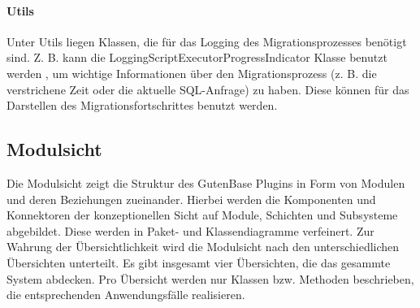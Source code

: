 	\paragraph*{Utils}
	Unter Utils liegen Klassen, die für das Logging des Migrationsprozesses benötigt sind. Z. B. kann die LoggingScriptExecutorProgressIndicator Klasse  benutzt werden , um wichtige Informationen über den Migrationsprozess (z. B. die verstrichene Zeit oder die aktuelle SQL-Anfrage) zu haben. Diese können für das Darstellen des Migrationsfortschrittes benutzt werden.
	
	
	
	
	\subsection{Modulsicht}
	Die Modulsicht zeigt die Struktur des GutenBase Plugins in Form von Modulen und deren Beziehungen zueinander. Hierbei werden die Komponenten und Konnektoren der konzeptionellen Sicht auf Module, Schichten und Subsysteme abgebildet. Diese werden in Paket- und Klassendiagramme verfeinert.
	Zur Wahrung der Übersichtlichkeit wird die Modulsicht nach den unterschiedlichen Übersichten unterteilt. Es gibt insgesamt vier Übersichten, die das gesammte System abdecken. Pro Übersicht werden nur Klassen bzw. Methoden beschrieben, die entsprechenden Anwendungsfälle realisieren.
	
